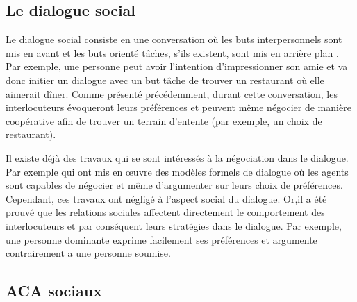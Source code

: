 \documentclass[a4paper,french]{article}
\begin{document}
\subsection{Le dialogue social}
\par Le dialogue social consiste en une conversation où les buts interpersonnels sont mis en avant et les buts orienté tâches, s'ils existent, sont mis en arrière plan \cite{bickmore2005social}. Par exemple, une personne peut avoir l'intention d'impressionner son amie et va donc initier un dialogue avec un but  tâche de trouver un restaurant où elle aimerait dîner. Comme présenté précédemment, durant cette conversation, les interlocuteurs évoqueront leurs préférences et peuvent même négocier de manière coopérative afin de trouver un terrain d'entente (par exemple, un choix de restaurant).  



\par Il existe déjà  des travaux qui se sont intéressés à la négociation  dans le dialogue. Par exemple \cite{amgoud2000arguments, daskalopulu1998handling} qui ont mis en œuvre des modèles formels de dialogue où les agents sont capables de négocier et même d'argumenter sur leurs choix de préférences. Cependant, ces travaux ont négligé à l'aspect social du dialogue. Or,il a été prouvé que les relations sociales affectent directement le comportement des interlocuteurs \cite{bickmore2000weather, bickmore2005establishing, moon1998intimate, nass2000does} et par conséquent leurs stratégies dans le dialogue. Par exemple, une personne dominante exprime facilement ses préférences et argumente contrairement a une personne soumise. 


\subsection{ACA sociaux}
\end{document}
